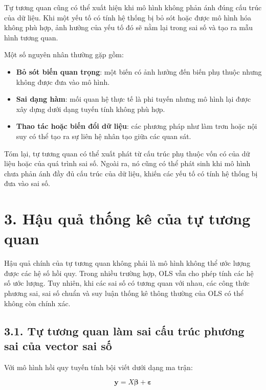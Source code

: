 \documentclass[12pt,a4paper]{article}
\begin{document}
Tự tương quan cũng có thể xuất hiện khi mô hình không phản ánh đúng cấu trúc của dữ liệu. Khi một yếu tố có tính hệ thống bị bỏ sót hoặc được mô hình hóa không phù hợp, ảnh hưởng của yếu tố đó sẽ nằm lại trong sai số và tạo ra mẫu hình tương quan.

Một số nguyên nhân thường gặp gồm:

\begin{itemize}
    \item \textbf{Bỏ sót biến quan trọng}: một biến có ảnh hưởng đến biến phụ thuộc nhưng không được đưa vào mô hình.
    
    \item \textbf{Sai dạng hàm}: mối quan hệ thực tế là phi tuyến nhưng mô hình lại được xây dựng dưới dạng tuyến tính không phù hợp.
    
    \item \textbf{Thao tác hoặc biến đổi dữ liệu}: các phương pháp như làm trơn hoặc nội suy có thể tạo ra sự liên hệ nhân tạo giữa các quan sát.
\end{itemize}

Tóm lại, tự tương quan có thể xuất phát từ cấu trúc phụ thuộc vốn có của dữ liệu hoặc của quá trình sai số. Ngoài ra, nó cũng có thể phát sinh khi mô hình chưa phản ánh đầy đủ cấu trúc của dữ liệu, khiến các yếu tố có tính hệ thống bị đưa vào sai số.


\section{3. Hậu quả thống kê của tự tương
quan}\label{hux1eadu-quux1ea3-thux1ed1ng-kuxea-cux1ee7a-tux1ef1-tux1b0ux1a1ng-quan}

Hậu quả chính của tự tương quan không phải là mô hình không thể ước lượng được các hệ số hồi quy. Trong nhiều trường hợp, OLS vẫn cho phép tính các hệ số ước lượng. Tuy nhiên, khi các sai số có tương quan với nhau, các công thức phương sai, sai số chuẩn và suy luận thống kê thông thường của OLS có thể không còn chính xác.

\subsection{3.1. Tự tương quan làm sai cấu trúc phương sai của vector
sai
số}\label{tux1ef1-tux1b0ux1a1ng-quan-luxe0m-sai-cux1ea5u-truxfac-phux1b0ux1a1ng-sai-cux1ee7a-vector-sai-sux1ed1}

Với mô hình hồi quy tuyến tính bội viết dưới dạng ma trận:

\[
\mathbf{y} = X\boldsymbol{\beta} + \boldsymbol{\varepsilon}
\]
\end{document}
